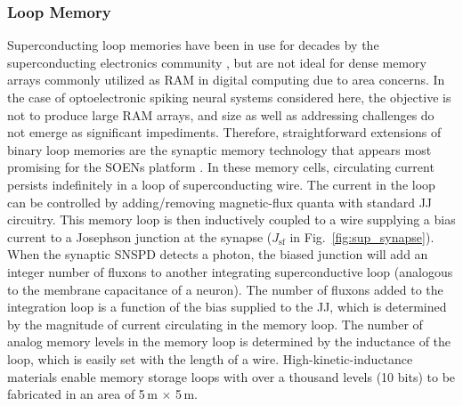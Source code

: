 \documentclass[twocolumn]{article}
\begin{document}
\subsubsection{Loop Memory}\label{Loops}
Superconducting loop memories have been in use for decades by the superconducting electronics community \cite{vatu1998,ka1999}, but are not ideal for dense memory arrays commonly utilized as RAM in digital computing due to area concerns. In the case of optoelectronic spiking neural systems considered here, the objective is not to produce large RAM arrays, and size as well as addressing challenges do not emerge as significant impediments. Therefore, straightforward extensions of binary loop memories are the synaptic memory technology that appears most promising for the SOENs platform \cite{sh2018,shainline2019superconducting}. In these memory cells, circulating current persists indefinitely in a loop of superconducting wire. The current in the loop can be controlled by adding/removing magnetic-flux quanta with standard JJ circuitry. This memory loop is then inductively coupled to a wire supplying a bias current to a Josephson junction at the synapse ($J_{\mathrm{sf}}$ in Fig.\, \ref{fig:sup_synapse}). When the synaptic SNSPD detects a photon, the biased junction will add an integer number of fluxons to another integrating superconductive loop (analogous to the membrane capacitance of a neuron). The number of fluxons added to the integration loop is a function of the bias supplied to the JJ, which is determined by the magnitude of current circulating in the memory loop. The number of analog memory levels in the memory loop is determined by the inductance of the loop, which is easily set with the length of a wire. High-kinetic-inductance materials \cite{tobo2018} enable memory storage loops with over a thousand levels (10 bits) to be fabricated in an area of 5\,\textmu m $\times$ 5\,\textmu m. 
\end{document}
